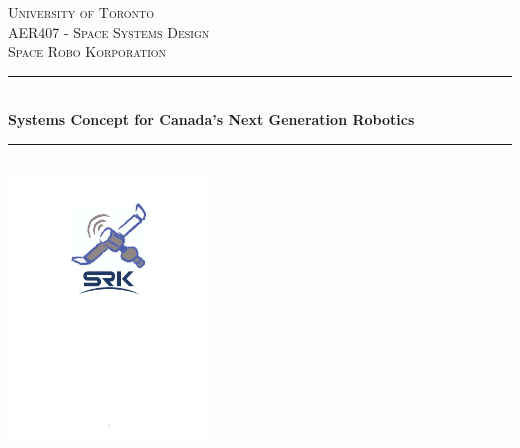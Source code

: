 \newcommand{\HRule}{\rule{\linewidth}{0.5mm}} %
\begin{titlepage}


\center %
 

\textsc{\LARGE University of Toronto}\\[1.2cm] %
\textsc{\Large AER407 - Space Systems Design}\\[0.5cm] %
\textsc{\large Space Robo Korporation}\\[0.5cm] %


\HRule \\[0.4cm]
{ \huge \bfseries Systems Concept for Canada's Next Generation Robotics}\\[0.5cm] %
\HRule \\[1.2cm]


\includegraphics[width=0.4\textwidth]{logo}\\[1cm] 




\end{titlepage}
